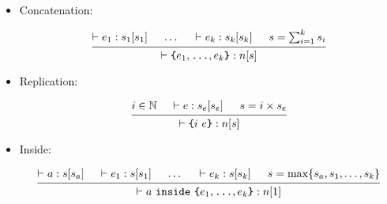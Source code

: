 \documentclass{article}
\newcommand{\type}[3]{\vdash#2:#1[#3]}
\begin{document}
\begin{itemize}[leftmargin=*]
    \item Concatenation:

          \begin{equation*}
              \begin{prooftree}
                  \hypo{\type{s_1}{e_1}{s_1}}
                  \hypo{\dots}
                  \hypo{\type{s_k}{e_k}{s_k}}
                  \hypo{s = \sum_{i=1}^{k} s_i}
                  \infer4{\type{n}{\texttt{\{}e_1, \texttt{\dots}, e_k \texttt{\}}}{s}}
              \end{prooftree}
          \end{equation*}

    \item Replication:

          \begin{equation*}
              \begin{prooftree}
                  \hypo{i \in \mathbb{N}}
                  \hypo{\type{s_e}{e}{s_e}}
                  \hypo{s = i \times s_e}
                  \infer3{\type{n}{\texttt{\{}i~e\texttt{\}}}{s}}
              \end{prooftree}
          \end{equation*}

    \item Inside:

          \begin{equation*}
              \begin{prooftree}
                  \hypo{\type{s}{a}{s_a}}
                  \hypo{\type{s}{e_1}{s_1}}
                  \hypo{\dots}
                  \hypo{\type{s}{e_k}{s_k}}
                  \hypo{s = \max\{s_a, s_1, \dots, s_k\}}
                  \infer5{\type{n}{a~\texttt{inside}~\texttt{\{}e_1, \texttt{\dots}, e_k \texttt{\}}}{1}}
              \end{prooftree}
          \end{equation*}
\end{itemize}
\end{document}

